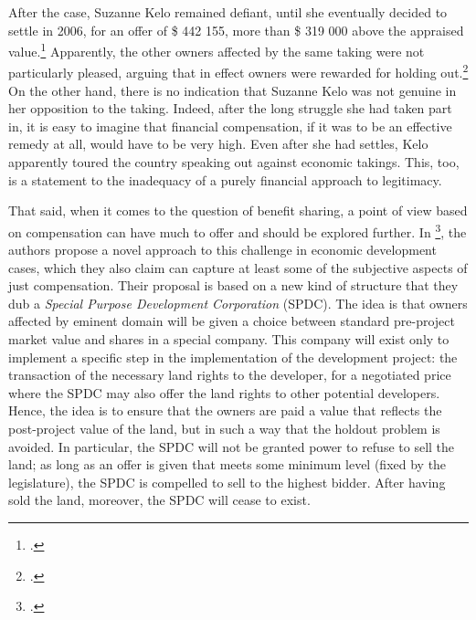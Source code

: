 After the case, Suzanne Kelo remained defiant, until she eventually decided to settle in 2006, for an offer of \$ 442 155, more than \$ 319 000 above the appraised value.\footcite[1709]{eminc07} Apparently, the other owners affected by the same taking were not particularly pleased, arguing that in effect owners were rewarded for holding out.\footcite[1709]{eminc07} On the other hand, there is no indication that Suzanne Kelo was not genuine in her opposition to the taking. Indeed, after the long struggle she had taken part in, it is easy to imagine that financial compensation, if it was to be an effective remedy at all, would have to be very high. Even after she had settles, Kelo apparently toured the country speaking out against economic takings. This, too, is a statement to the inadequacy of a purely financial approach to legitimacy. 

That said, when it comes to the question of benefit sharing, a point of view based on compensation can have much to offer and should be explored further. In \footcite{eminc07}, the authors propose a novel approach to this challenge in economic development cases, which they also claim can capture at least some of the subjective aspects of just compensation. Their proposal is based on a new kind of structure that they dub a {\it Special Purpose Development Corporation} (SPDC). The idea is that owners affected by eminent domain will be given a choice between standard pre-project market value and shares in a special company. This company will exist only to implement a specific step in the implementation of the development project: the transaction of the necessary land rights to the developer, for a negotiated price where the SPDC may also offer the land rights to other potential developers. Hence, the idea is to ensure that the owners are paid a value that reflects the post-project value of the land, but in such a way that the holdout problem is avoided. In particular, the SPDC will not be granted power to refuse to sell the land; as long as an offer is given that meets some minimum level (fixed by the legislature), the SPDC is compelled to sell to the highest bidder.  After having sold the land, moreover, the SPDC will cease to exist. 

